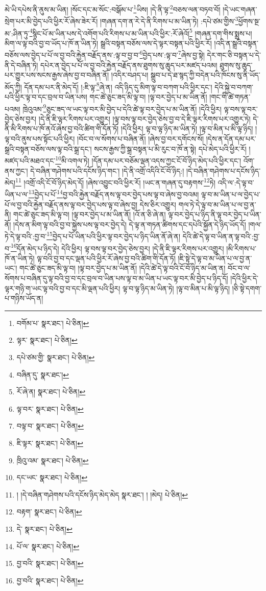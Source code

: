 མེ་ཡི་དཔེས་ནི་ནུས་མ་ཡིན། །སོང་དང་མ་སོང་:བསྒོམ་པ་\footnote{བགོམ་པ་  སྣར་ཐང་།  པེ་ཅིན། }ཡིས། །དེ་ནི་ལྟ་\footnote{ལྟར་  སྣར་ཐང་།  པེ་ཅིན། }བཅས་ལན་བཏབ་བོ། །དེ་ཡང་གཞན་སྲེག་པར་མི་བྱེད་པའི་ཕྱིར་རོ་ཞེས་ཟེར་རོ། །གཞན་དག་ན་རེ་དེ་ནི་རིགས་པ་མ་ཡིན་ཏེ། :དཔེ་ཙམ་གྱིས་\footnote{དཔེ་ཙམ་གྱི་  སྣར་ཐང་།  པེ་ཅིན། }ཕྱོགས་སྔ་མ་:ཤིན་ཏུ་\footnote{བཞིན་དུ་  སྣར་ཐང་། }སྙིང་པོ་མ་ཡིན་པས་དེ་འགོག་པའི་རིགས་པ་མ་ཡིན་པའི་ཕྱིར་:རོ་ཞེའོ།\footnote{རོ་ཞེ་ན།  སྣར་ཐང་།  པེ་ཅིན། } །གཞན་དག་གིས་སྨྲས་པ། མིག་ལ་ལྟ་བའི་བྱ་བ་ཡོད་པ་ཁོ་ན་ཡིན་ཏེ། སྒྲའི་བསྟན་བཅོས་ལས་དེ་ལྟར་བསྟན་པའི་ཕྱིར་རོ། །འདི་ན་སྒྲའི་བསྟན་བཅོས་ལས་བྱེད་པ་པོ་ལ་བྱ་བའི་རྐྱེན་བརྗོད་ནས་:ལྟ་བ་བྱ་བ་\footnote{ལྟ་བར་  སྣར་ཐང་།  པེ་ཅིན། }བྱེད་པས་:ལྟ་བ་\footnote{བལྟ་བ་  སྣར་ཐང་།  པེ་ཅིན། }ཞེས་བྱ་སྟེ། དེར་གང་ཅི་བསྟན་པ་དེ་ནི་དེ་བཞིན་ཏེ། དཔེར་ན་བྱེད་པ་པོ་ལ་བྱ་བའི་རྐྱེན་བརྗོད་ནས་ཐུགས་སུ་ཆུད་པར་མཛད་པའམ། ཐུགས་སུ་ཆུད་པར་གྱུར་པས་སངས་རྒྱས་ཞེས་བྱ་བ་བཞིན་ནོ། །འདིར་བཤད་པ། སྒྲུབ་པ་དེ་ཐ་སྙད་ཀྱི་བདེན་པའི་ཁོངས་སུ་ནི་ཡོད་མོད་ཀྱི། དོན་དམ་པར་ནི་མེད་དོ། །:ཇི་ལྟ་\footnote{ཇི་ལྟར་  སྣར་ཐང་།  པེ་ཅིན། }ཞེ་ན། འདི་ཉིད་དུ་མིག་ལྟ་བ་བཀག་པའི་ཕྱིར་དང་། དེའི་སྐྱེ་བ་བཀག་པའི་ཕྱིར་ལྟ་བ་དང་བྲལ་བ་ཡིན་པས། གང་ཚེ་ཅུང་ཟད་མི་ལྟ་བ། །ལྟ་བར་བྱེད་པ་མ་ཡིན་ནོ། །གང་གི་ཚེ་གཏན་པའམ། ཁྲེའུའམ་\footnote{ཁྲིའུ་འམ་  སྣར་ཐང་།  པེ་ཅིན། }ཅུང་ཟད་ལ་ཡང་ལྟ་བར་མི་བྱེད་པ་དེའི་ཚེ་ལྟ་བར་བྱེད་པ་མ་ཡིན་ནོ། །དེའི་ཕྱིར། ལྟ་བས་ལྟ་བར་བྱེད་ཅེས་བྱར། །དེ་ནི་ཇི་ལྟར་རིགས་པར་འགྱུར། །ལྟ་བས་ལྟ་བར་བྱེད་ཅེས་བྱ་བ་དེ་ཇི་ལྟར་རིགས་པར་འགྱུར་ཏེ། དེ་ནི་མི་རིགས་པ་ཁོ་ནའོ་ཞེས་བྱ་བའི་ཚིག་གི་དོན་ཏོ། །དེའི་ཕྱིར། ལྟ་བ་ལྟ་ཉིད་མ་ཡིན་ཏེ། །ལྟ་བ་མིན་པ་མི་ལྟ་ཉིད། །ལྟ་བའི་ནུས་པས་སྟོང་པའི་ཕྱིར། །བོང་བ་ལ་སོགས་པ་བཞིན་ནོ། །ཞེས་བྱ་བར་དགོངས་སོ། །དེས་ན་དོན་དམ་པར་སྒྲའི་བསྟན་བཅོས་ལས་ལྟ་བའི་སྒྲ་དང་། སངས་རྒྱས་ཀྱི་སྒྲ་བསྟན་པ་མི་རུང་བ་ཁོ་ན་སྟེ། དཔེ་མེད་པའི་ཕྱིར་རོ། །མཛད་པའི་མཐའ་དང་\footnote{དང་ཡང་  སྣར་ཐང་།  པེ་ཅིན། }མི་འགལ་ཏེ། །དོན་དམ་པར་བཅོམ་ལྡན་འདས་ཀྱང་ངོ་བོ་ཉིད་མེད་པའི་ཕྱིར་དང་། འོག་ནས་ཀྱང་། དེ་བཞིན་གཤེགས་པའི་དངོས་ཉིད་གང་། །དེ་ནི་འགྲོ་འདིའི་ངོ་བོ་ཉིད:། །དེ་བཞིན་གཤེགས་པ་དངོས་ཉིད་མེད།\footnote{། །དེ་བཞིན་གཤེགས་པའི་དངོས་ཉིད་མེད་མེད  སྣར་ཐང་། ། །མེད།  པེ་ཅིན། } །འགྲོ་འདི་ངོ་བོ་ཉིད་མེད་དོ། །ཞེས་འབྱུང་བའི་ཕྱིར་རོ། །ཡང་ན་གཞན་དུ་བརྟགས་\footnote{བརྟག་  སྣར་ཐང་།  པེ་ཅིན། }ཏེ། འདི་ལ་:དེ་ལྟ་བ་ཡིན་པ་ལ་\footnote{དེ་  སྣར་ཐང་།  པེ་ཅིན། }བྱེད་པ་པོ་\footnote{པོ་ལ་  སྣར་ཐང་།  པེ་ཅིན། }བྱ་བའི་རྐྱེན་བརྗོད་ནས་ལྟ་བར་བྱེད་པས་ལྟ་བ་ཞེས་བྱ་བའམ། ལྟ་བ་མ་ཡིན་པ་ལ་བྱེད་པ་པོ་ལ་བྱ་བའི་རྐྱེན་བརྗོད་ནས་ལྟ་བར་བྱེད་པས་ལྟ་བ་ཞེས་བྱ། དེས་ཅིར་འགྱུར། གལ་ཏེ་དེ་ལྟ་བ་མ་ཡིན་པ་ལ་བྱ་ན་ནི། གང་ཚེ་ཅུང་ཟད་མི་ལྟ་བ། །ལྟ་བར་བྱེད་པ་མ་ཡིན་ནོ། །འོ་ན་ཅི་ཞེ་ན། ལྟ་བར་བྱེད་པ་ཉིད་ནི་ལྟ་བར་བྱེད་པ་ཡིན་ནོ། །དེས་ན་མིག་ལྟ་བའི་བྱ་བ་སྐྱེས་པས་ལྟ་བར་བྱེད་དེ། དེ་ལྟ་ན་གཏན་ཚིགས་དང་དཔེའི་སྐྱོན་དེ་ཉིད་ཡོད་དོ། །གལ་ཏེ་དེ་ལྟ་བའི་:བྱ་བ་\footnote{བྱ་བའི་  སྣར་ཐང་།  པེ་ཅིན། }བྱེད་པ་པོ་ཡིན་པའི་ཕྱིར་ལྟ་བར་བྱེད་པ་ཉིད་ཡིན་ནོ་ཞེ་ན། དེའི་ཚེ་དེ་ལྟ་བ་ཡིན་ན་ལྟ་བའི་:བྱ་བ་\footnote{བྱ་བའི་  སྣར་ཐང་།  པེ་ཅིན། }དོན་མེད་པ་ཉིད་དེ། དེའི་ཕྱིར། ལྟ་བས་ལྟ་བར་བྱེད་ཅེས་བྱར། །དེ་ནི་ཇི་ལྟར་རིགས་པར་འགྱུར། །མི་རིགས་པ་ཁོ་ན་ཡིན་ཏེ། ལྟ་བའི་བྱ་བ་དང་ལྡན་པའི་ཕྱིར་རོ་ཞེས་བྱ་བའི་ཚིག་གི་དོན་ཏོ། །ཇི་སྟེ་དེ་ལྟ་བ་མ་ཡིན་པ་ལ་བྱ་ན་ཡང་། གང་ཚེ་ཅུང་ཟད་མི་ལྟ་བ། །ལྟ་བར་བྱེད་པ་མ་ཡིན་ནོ། །དེའི་ཚེ་དེ་ལྟ་བའི་ངོ་བོ་ཉིད་མ་ཡིན་ན། བོང་བ་ལ་སོགས་པ་བཞིན་དུ་ལྟ་བའི་བྱ་བ་དང་བྲལ་བ་ཡིན་པས་ལྟ་བ་མ་ཡིན་པ་ཡང་ལྟ་བར་མི་བྱེད་པ་ཉིད་དོ། །དེའི་ཕྱིར་དེ་ལྟར་གཉི་ག་ཡང་ལྟ་བའི་བྱ་བ་དང་མི་ལྡན་པའི་ཕྱིར། ལྟ་བ་ལྟ་ཉིད་མ་ཡིན་ཏེ། །ལྟ་བ་མིན་པ་མི་ལྟ་ཉིད། །ཅི་སྟེ་དགག་པ་གཉིས་ཡོད་ན། 